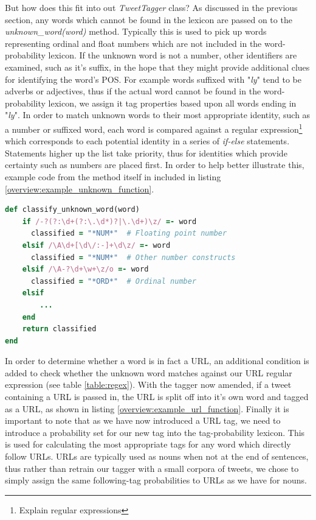 But how does this fit into out \emph{TweetTagger} class? As discussed in the previous section, any words which cannot be found in the lexicon are passed on to the \emph{unknown\_word(word)} method. Typically this is used to pick up words representing ordinal and float numbers which are not included in the word-probability lexicon. If the unknown word is not a number, other identifiers are examined, such as it's suffix, in the hope that they might provide additional clues for identifying the word's POS. For example words suffixed with "\emph{ly}" tend to be adverbs or adjectives, thus if the actual word cannot be found in the word-probability lexicon, we assign it tag properties based upon all words ending in "\emph{ly}". In order to match unknown words to their most appropriate identity, such as a number or suffixed word, each word is compared against a regular expression\footnote{Explain regular expressions} which corresponds to each potential identity in a series of \emph{if-else} statements. Statements higher up the list take priority, thus for identities which provide certainty such as numbers are placed first. In order to help better illustrate this, example code from the method itself in included in listing \ref{overview:example_unknown_function}.

\begin{lstlisting}[language=Ruby, caption={Example if-else statements for handling unknown words}, label=overview:example_unknown_function]
def classify_unknown_word(word)
	if /-?(?:\d+(?:\.\d*)?|\.\d+)\z/ =- word 
	  classified = "*NUM*"	# Floating point number
	elsif /\A\d+[\d\/:-]+\d\z/ =- word  
	  classified = "*NUM*"	# Other number constructs
	elsif /\A-?\d+\w+\z/o =- word
	  classified = "*ORD*"	# Ordinal number
	elsif
		...
	end
	return classified
end
\end{lstlisting}

In order to determine whether a word is in fact a URL, an additional condition is added to check whether the unknown word matches against our URL regular expression (see table \ref{table:regex}). With the tagger now amended, if a tweet containing a URL is passed in, the URL is split off into it's own word and tagged as a URL, as shown in listing \ref{overview:example_url_function}. Finally it is important to note that as we have now introduced a URL tag, we need to introduce a probability set for our new tag into the tag-probability lexicon. This is used for calculating the most appropriate tags for any word which directly follow URLs. URLs are typically used as nouns when not at the end of sentences, thus rather than retrain our tagger with a small corpora of tweets, we chose to simply assign the same following-tag probabilities to URLs as we have for nouns.

